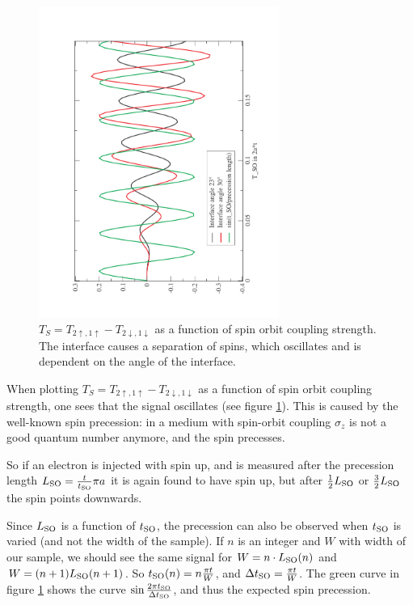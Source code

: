 \begin{figure}
    \begin{center}
    \includegraphics[angle=270,width=0.7\textwidth]{interface-precession.pdf}
    \end{center}
    \caption{$T_S = T_{2\uparrow,1\uparrow}-T_{2\downarrow,1\downarrow}$ as a
        function of spin orbit coupling strength. The interface causes a
        separation of spins, which oscillates and is dependent on the angle of
        the interface.}
    \label{fig:interface-precession}
\end{figure}

When plotting $T_S = T_{2\uparrow,1\uparrow}-T_{2\downarrow,1\downarrow}$ as a
function of spin orbit coupling strength, one sees that the signal oscillates
(see figure \ref{fig:interface-precession}).
This is caused by the well-known %
spin precession: in a medium with spin-orbit coupling $\sigma_z$ is not a good
quantum number anymore, and the spin precesses. %

So if an electron is injected with spin up, and is measured after the
precession length $L_{\textnormal{SO}} = \frac{t}{t_{\textnormal{SO}}}\pi a$ it is again found to have
spin up, but after $\frac12 L_{\textnormal{SO}}$ or $\frac32 L_{\textnormal{SO}}$ the spin points
downwards. 

Since  $L_{\textnormal{SO}}$ is a function of $t_{\textnormal{SO}}$, the precession can also be
observed when $t_{\textnormal{SO}}$ is varied (and not the width of the sample).
If $n$ is an integer and $W$ with width of our sample, we should see the
same signal for $W = n \cdot L_{\textnormal{SO}}(n)$ and $W = (n+1) L_{\textnormal{SO}}(n+1)$. So
$t_{\textnormal{SO}}(n) = n\frac{\pi t}{W}$, and $\Delta t_{\textnormal{SO}} = \frac{\pi t}{W}$.  The green
curve in figure \ref{fig:interface-precession} shows the curve
$\sin{\frac{2 \pi \ensuremath{t_{\textnormal{SO}}}}{\Delta \ensuremath{t_{\textnormal{SO}}}}}$, and thus the expected spin precession.

